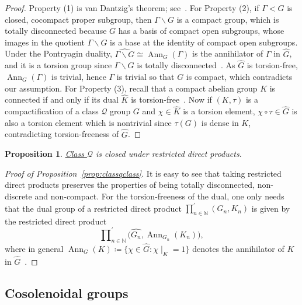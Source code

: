 \documentclass{amsart}
\numberwithin{equation}{subsection}
\newtheorem{prop}[thm]{Proposition}
\theoremstyle{remark}
\begin{document}
\begin{proof}
Property (1) is van Dantzig's theorem; see~\cite[Theorem (7.7)]{HewittRoss}. For Property (2), if \(\Gamma<G\) is closed, cocompact proper subgroup, then \(\Gamma \backslash G\) is a compact group, which is totally disconnected because \(G\) has a basis of compact open subgroups, whose images in the quotient \(\Gamma\backslash G\) is a base at the identity of compact open subgroups. Under the Pontryagin duality, \(\widehat{\Gamma\backslash G}\cong\operatorname{Ann}_{G}\left(\Gamma\right)\) is the annihilator of \(\Gamma\) in \(\widehat{G}\), and it is a torsion group since \(\Gamma\backslash G\) is totally disconnected~\cite[Theorem (24.26)]{HewittRoss}. As \(\widehat{G}\) is torsion-free, \(\operatorname{Ann}_{G}\left(\Gamma\right)\) is trivial, hence \(\Gamma\) is trivial so that \(G\) is compact, which contradicts our assumption. For Property (3), recall that a compact abelian group \(K\) is connected if and only if its dual \(\widehat{K}\) is torsion-free~\cite[Theorem (24.25)]{HewittRoss}. Now if \(\left(K,\tau\right)\) is a compactification of a class \(\mathcal{Q}\) group \(G\) and \(\chi\in\widehat{K}\) is a torsion element, \(\chi\circ\tau\in\widehat{G}\) is also a torsion element which is nontrivial since \(\tau\left(G\right)\) is dense in \(K\), contradicting torsion-freeness of \(\widehat{G}\).
\end{proof}

\begin{prop}
\hyperlink{classQ}{Class \(\mathcal{Q}\)} is closed under restricted direct products.
\end{prop}

\begin{proof}[Proof of Proposition~\ref{prop:classqclass}]
It is easy to see that taking restricted direct products preserves the properties of being totally disconnected, non-discrete and non-compact. For the torsion-freeness of the dual, one only needs that the dual group of a restricted direct product \(\prod\nolimits_{n\in\mathbb{N}}^{\prime}\left(G_{n},K_{n}\right)\) is given by the restricted direct product
\[\prod\nolimits _{n\in\mathbb{N}}^{\prime}\big(\widehat{G_{n}},\operatorname{Ann}_{G_{n}}\left(K_{n}\right)\big),\]
where in general \(\operatorname{Ann}_{G}\left(K\right)\coloneqq\{ \chi\in\widehat{G}:\chi\mid_{K}=1\}\) denotes the annihilator of \(K\) in \(\widehat{G}\)~\cite[(23.33)]{HewittRoss}.
\end{proof}

\subsection{Cosolenoidal groups}
\end{document}
